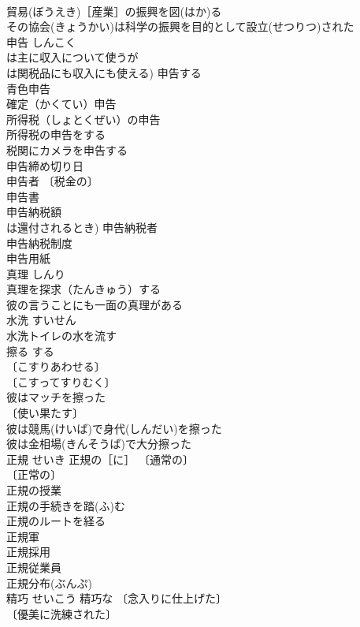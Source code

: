 \documentclass[8pt]{extreport}
\begin{document}
\begin{CJK}{UTF8}{min}
\\	貿易(ぼうえき)［産業］の振興を図(はか)る 
\\	その協会(きょうかい)は科学の振興を目的として設立(せつりつ)された 
\\	申告	しんこく	
\\	は主に収入について使うが
\\	は関税品にも収入にも使える) 申告する 
\\	青色申告 
\\	確定（かくてい）申告 
\\	所得税（しょとくぜい）の申告 
\\	所得税の申告をする 
\\	税関にカメラを申告する 
\\	申告締め切り日 
\\	申告者 〔税金の〕
\\	申告書 
\\	申告納税額 
\\	は還付されるとき) 申告納税者 
\\	申告納税制度 
\\	申告用紙 
\\	真理	しんり	
\\	真理を探求（たんきゅう）する 
\\	彼の言うことにも一面の真理がある 
\\	水洗	すいせん	
\\	水洗トイレの水を流す 
\\	擦る	する	
\\	〔こすりあわせる〕
\\	〔こすってすりむく〕
\\	彼はマッチを擦った 
\\	〔使い果たす〕
\\	彼は競馬(けいば)で身代(しんだい)を擦った 
\\	彼は金相場(きんそうば)で大分擦った 
\\	正規	せいき	正規の［に］ 〔通常の〕
\\	〔正常の〕
\\	正規の授業 
\\	正規の手続きを踏(ふ)む 
\\	正規のルートを経る 
\\	正規軍 
\\	正規採用 
\\	正規従業員 
\\	正規分布(ぶんぷ) 
\\	精巧	せいこう	精巧な 〔念入りに仕上げた〕
\\	〔優美に洗練された〕

\end{CJK}
\end{document}

